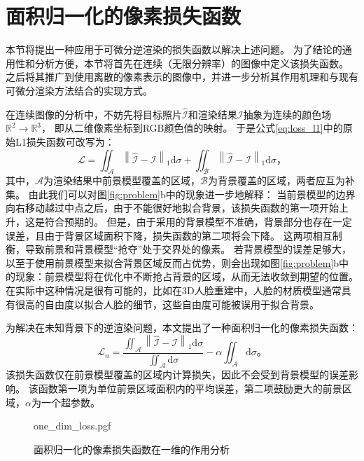 \section{面积归一化的像素损失函数}

本节将提出一种应用于可微分逆渲染的损失函数以解决上述问题。
为了结论的通用性和分析方便，本节将首先在连续（无限分辨率）的图像中定义该损失函数。
之后将其推广到使用离散的像素表示的图像中，并进一步分析其作用机理和与现有可微分渲染方法结合的实现方式。

在连续图像的分析中，不妨先将目标照片$\hat{\mathcal{I}}$和渲染结果$\mathcal{I}$抽象为连续的颜色场$\mathbb{R}^2 \to \mathbb{R}^3$，
即从二维像素坐标到RGB颜色值的映射。
于是公式\eqref{eq:loss_l1}中的原始L1损失函数可改写为：
\begin{equation}
\mathcal{L} = \iint_{\mathcal{A}} \left\| \hat{\mathcal{I}} - \mathcal{I} \right\|_1 \mathrm{d}\sigma +
\iint_{\mathcal{B}} \left\| \hat{\mathcal{I}} - \mathcal{I} \right\|_1 \mathrm{d}\sigma
\text{，}
\label{eq:loss_l1_area}
\end{equation}
其中，$\mathcal{A}$为渲染结果中前景模型覆盖的区域，$\mathcal{B}$为背景覆盖的区域，两者应互为补集。
由此我们可以对图\ref{fig:problem}b中的现象进一步地解释：
当前景模型的边界向右移动越过中点之后，由于不能很好地拟合背景，该损失函数的第一项开始上升，这是符合预期的。
但是，由于采用的背景模型不准确，背景部分也存在一定误差，且由于背景区域面积下降，损失函数的第二项将会下降。
这两项相互制衡，导致前景和背景模型“抢夺”处于交界处的像素。
若背景模型的误差足够大，以至于使用前景模型来拟合背景区域反而占优势，则会出现如图\ref{fig:problem}b中的现象：前景模型将在优化中不断抢占背景的区域，从而无法收敛到期望的位置。
在实际中这种情况是很有可能的，比如在3D人脸重建中，人脸的材质模型通常具有很高的自由度以拟合人脸的细节，这些自由度可能被误用于拟合背景。

为解决在未知背景下的逆渲染问题，本文提出了一种面积归一化的像素损失函数：
\begin{equation}
\mathcal{L}_n = \frac{\iint_{\mathcal{A}} \left\| \hat{\mathcal{I}} - \mathcal{I} \right\|_1 \mathrm{d}\sigma}
{\iint_{\mathcal{A}}\mathrm{d}\sigma}
-\alpha\iint_{\mathcal{A}}\mathrm{d}\sigma
\text{。}
\label{eq:loss_n}
\end{equation}
该损失函数仅在前景模型覆盖的区域内计算损失，因此不会受到背景模型的误差影响。
该函数第一项为单位前景区域面积内的平均误差，第二项鼓励更大的前景区域，$\alpha$为一个超参数。

\begin{figure}
\centering
{one_dim_loss.pgf}
\caption{面积归一化的像素损失函数在一维的作用分析}
\label{fig:one_dim_loss}
\end{figure}

